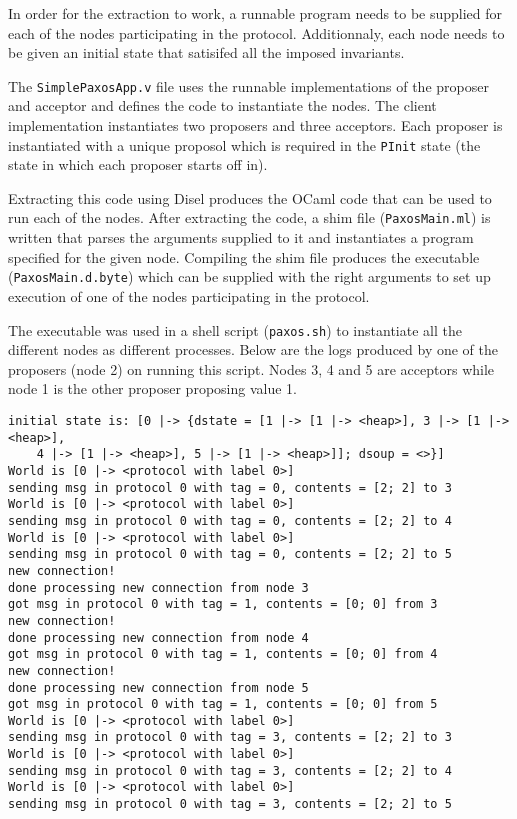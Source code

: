 In order for the extraction to work, a runnable program needs to be supplied for each of
the nodes participating in the protocol. Additionnaly, each node needs to
be given an initial state that satisifed all the imposed invariants.

The \texttt{SimplePaxosApp.v} file uses the runnable implementations of
the proposer and acceptor and defines the code to instantiate the nodes.
The client implementation instantiates two proposers and three acceptors.
Each proposer is instantiated with a unique proposol which is required in the
\texttt{PInit} state (the state in which each proposer starts off in).

Extracting this code using Disel produces the OCaml code
that can be used to run each of the nodes. After extracting the code,
a shim file (\texttt{PaxosMain.ml}) is written that parses the arguments
supplied to it and instantiates a program specified
for the given node. Compiling the shim file produces the executable (\texttt{PaxosMain.d.byte})
which can be supplied with the right arguments to set up execution of one
of the nodes participating in the protocol.

The executable was used in a shell script (\texttt{paxos.sh})
to instantiate all the different nodes as different processes.
Below are the logs produced by one of the
proposers (node 2) on running this script. Nodes 3, 4 and 5 are acceptors while
node 1 is the other proposer proposing value 1.

\begin{lstlisting}
initial state is: [0 |-> {dstate = [1 |-> [1 |-> <heap>], 3 |-> [1 |-> <heap>],
    4 |-> [1 |-> <heap>], 5 |-> [1 |-> <heap>]]; dsoup = <>}]
World is [0 |-> <protocol with label 0>]
sending msg in protocol 0 with tag = 0, contents = [2; 2] to 3
World is [0 |-> <protocol with label 0>]
sending msg in protocol 0 with tag = 0, contents = [2; 2] to 4
World is [0 |-> <protocol with label 0>]
sending msg in protocol 0 with tag = 0, contents = [2; 2] to 5
new connection!
done processing new connection from node 3
got msg in protocol 0 with tag = 1, contents = [0; 0] from 3
new connection!
done processing new connection from node 4
got msg in protocol 0 with tag = 1, contents = [0; 0] from 4
new connection!
done processing new connection from node 5
got msg in protocol 0 with tag = 1, contents = [0; 0] from 5
World is [0 |-> <protocol with label 0>]
sending msg in protocol 0 with tag = 3, contents = [2; 2] to 3
World is [0 |-> <protocol with label 0>]
sending msg in protocol 0 with tag = 3, contents = [2; 2] to 4
World is [0 |-> <protocol with label 0>]
sending msg in protocol 0 with tag = 3, contents = [2; 2] to 5
\end{lstlisting}

